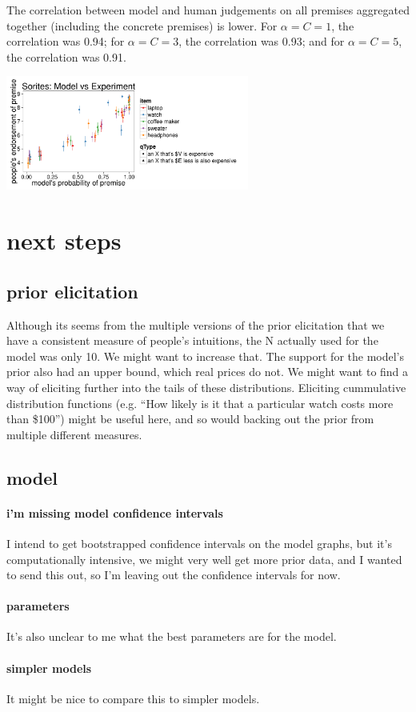 \documentclass[10pt]{article}
\begin{document}
  The correlation between model and human judgements on all premises aggregated together (including the concrete premises) is lower. For $\alpha=C=1$, the correlation was 0.94; for $\alpha=C=3$, the correlation was 0.93; and for $\alpha=C=5$, the correlation was 0.91.
  
  \includegraphics[width=0.6\textwidth]{sorites-model-vs-people_all_alpha1_cost1.pdf}
  
\section{next steps}
  \subsection{prior elicitation}
    Although its seems from the multiple versions of the prior elicitation that we have a consistent measure of people's intuitions, the N actually used for the model was only 10. We might want to increase that. The support for the model's prior also had an upper bound, which real prices do not. We might want to find a way of eliciting further into the tails of these distributions. Eliciting cummulative distribution functions (e.g. ``How likely is it that a particular watch costs more than \$100'') might be useful here, and so would backing out the prior from multiple different measures.
  
  \subsection{model}
    \paragraph{i'm missing model confidence intervals} I intend to get bootstrapped confidence intervals on the model graphs, but it's computationally intensive, we might very well get more prior data, and I wanted to send this out, so I'm leaving out the confidence intervals for now.
    
    \paragraph{parameters} It's also unclear to me what the best parameters are for the model.
    
    \paragraph{simpler models} It might be nice to compare this to simpler models.
\end{document}
